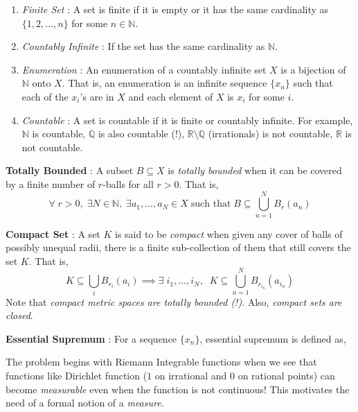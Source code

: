\documentclass{article}
\theoremstyle{definition}
\theoremstyle{remark}
\theoremstyle{definition}
\theoremstyle{definition}
\theoremstyle{definition}
\newcommand{\bunion}{\bigcup}
\newcommand{\R}{\mathbb{R}}
\newcommand{\N}{\mathbb{N}}
\newcommand{\Q}{\mathbb{Q}}
\begin{document}
\begin{itemize}
{\begin{enumerate}
	\item{\emph{Finite Set} : A set is finite if it is empty or it has the same cardinality as $ \{1,2,\dots,n\} $ for some $ n\in \N $.}
	\item{\emph{Countably Infinite} : If the set has the same cardinality as $ \N $.}
	\item {\emph{Enumeration} : An enumeration of a countably infinite set $ X $ is a bijection of $ \N $ onto $ X $. That is, an enumeration is an infinite sequence $ \{x_n\} $ such that each of the $ x_i $'s are in $ X $ and each element of $ X $ is $ x_i $ for some $ i $.}
	\item {\emph{Countable} : A set is countable if it is finite or countably infinite. For example, $ \N $ is countable, $ \Q $ is also countable (!), $ \R \setminus \Q $ (irrationals) is not countable, $ \R $ is not countable.}
\end{enumerate}	
\item {\textbf{Totally Bounded} : A subset $ B\subseteq X $ is \emph{totally bounded} when it can be covered by a finite number of $ r $-balls for all $ r>0 $. That is,
\[\forall \; r > 0,\;\exists N\in \N,\;\exists a_1,\dots,a_N\in X\;\text{such that}\;B\subseteq \bunion_{n=1}^N B_{r}(a_n)\]
}
\item{\textbf{Compact Set} : A set $ K $ is said to be \emph{compact} when given any cover of balls of possibly unequal radii, there is a finite sub-collection of them that still covers the set $ K $. That is,
\[K\subseteq \bunion_{i}B_{r_i}(a_i)\implies \exists \;i_1,\dots,i_N,\;\;K \subseteq \bunion_{n=1}^N B_{r_{i_n}}(a_{i_n})\]
Note that \emph{compact metric spaces are totally bounded (!)}. Also, \emph{compact sets are closed}.
}
\item {\textbf{Essential Supremum} : For a sequence $ \{x_n\} $, essential supremum is defined as,
\[\]
 }
} 
\end{itemize}
The problem begins with Riemann Integrable functions when we see that functions like Dirichlet function ($ 1 $ on  irrational and $ 0 $ on rational points) can become \emph{measurable} even when the function is not continuous! This motivates the need of a formal notion of a \emph{measure}.
\end{document}
